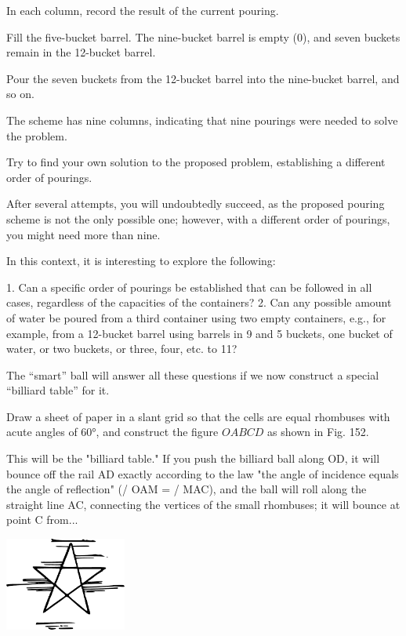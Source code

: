 
In each column, record the result of the current pouring. 

Fill the five-bucket barrel. The nine-bucket barrel is empty (0), and seven buckets remain in the 12-bucket barrel. 

Pour the seven buckets from the 12-bucket barrel into the nine-bucket barrel, and so on.

The scheme has nine columns, indicating that nine pourings were needed to solve the problem.

Try to find your own solution to the proposed problem, establishing a different order of pourings.

After several attempts, you will undoubtedly succeed, as the proposed pouring scheme is not the only possible one; however, with a different order of pourings, you might need more than nine.

In this context, it is interesting to explore the following:

1. Can a specific order of pourings be established that can be followed in all cases, regardless of the capacities of the containers?
2. Can any possible amount of water be poured from a third container using two empty containers, e.g., for example, from a 12-bucket barrel using barrels in 9 and 5 buckets, one bucket of water, or two buckets, or three, four, etc. to 11?

The ``smart'' ball will answer all these questions if we now construct a special ``billiard table'' for it.

Draw a sheet of paper in a slant grid so that the cells are equal rhombuses with acute angles of \ang{60}, and construct the figure $OABCD$ as shown in Fig. 152.

This will be the "billiard table." If you push the billiard ball along OD, it will bounce off the rail AD exactly according to the law "the angle of incidence equals the angle of reflection" (/ OAM = / MAC), and the ball will roll along the straight line AC, connecting the vertices of the small rhombuses; it will bounce at point C from...

\begin{center}
\includegraphics[width=0.3\textwidth]{figures/ch-10/fig-ch-10-tail.pdf}
\end{center}


















